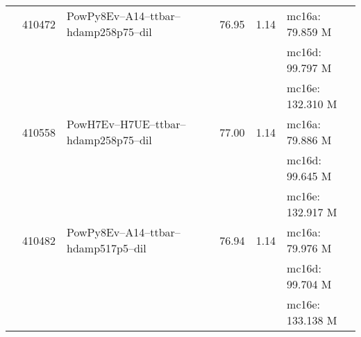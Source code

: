 \begin{center}
	\label{tab:mc_bkg_sys}
	\tablelasttail{\bottomrule}
	{
		\scriptsize
		\begin{xtabular}{lclS[round-mode=figures, round-precision=3]S[round-mode=places,  round-precision=2]l}
			
			\ttbar  & 410472 & PowPy8Ev--A14--ttbar--hdamp258p75--dil        & 76.95      & 1.14 & mc16a: 79.859 M   \\
			& & & & & mc16d:   99.797 M \\
			& & & & & mc16e: 132.310 M \\
			& 410558 & PowH7Ev--H7UE--ttbar--hdamp258p75--dil     & 77.00      & 1.14 & mc16a: 79.886 M   \\
			& & & & & mc16d:   99.645 M \\
			& & & & & mc16e: 132.917 M \\
			& 410482 & PowPy8Ev--A14--ttbar--hdamp517p5--dil        & 76.94      & 1.14 & mc16a: 79.976 M   \\
			& & & & & mc16d:   99.704 M \\
			& & & & & mc16e: 133.138 M \\
			

\end{xtabular}}
\end{center}
